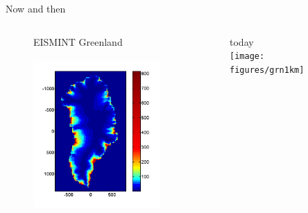 \documentclass[hide notes,intlimits,unknownkeysallowed]{beamer}
\begin{document}
\begin{frame}{Now and then}
 \begin{columns}[c]
    \begin{column}{.24\linewidth}
      \vspace{-.5cm}
      \begin{figure}
        EISMINT Greenland \\
        \includegraphics[height=6.5cm]{figures/greencbar-SSL2}
     \end{figure}
    \end{column}
    \begin{column}{.24\linewidth}
      \vspace{-.5cm}
      \begin{figure}
        today \\
        \texttt{[image: figures/grn1km]}
     \end{figure}
    \end{column}
  \end{columns}
\end{frame}
\end{document}
